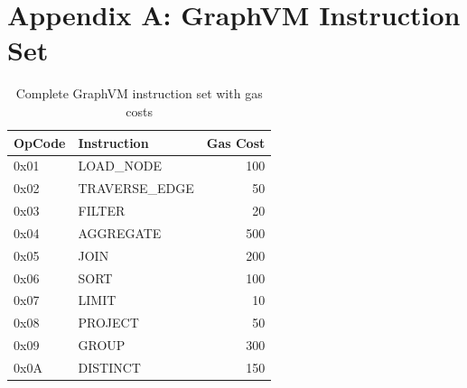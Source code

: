 \section{Appendix A: GraphVM Instruction Set}


\begin{table}[h]
\centering
\small
\begin{tabular}{@{}llr@{}}
\toprule
\textbf{OpCode} & \textbf{Instruction} & \textbf{Gas Cost} \\ \midrule
0x01 & LOAD\_NODE & 100 \\
0x02 & TRAVERSE\_EDGE & 50 \\
0x03 & FILTER & 20 \\
0x04 & AGGREGATE & 500 \\
0x05 & JOIN & 200 \\
0x06 & SORT & 100 \\
0x07 & LIMIT & 10 \\
0x08 & PROJECT & 50 \\
0x09 & GROUP & 300 \\
0x0A & DISTINCT & 150 \\ \bottomrule
\end{tabular}
\caption{Complete GraphVM instruction set with gas costs}
\end{table}

